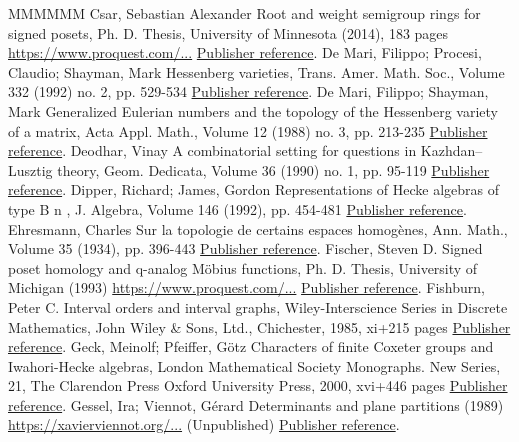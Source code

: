 \begin{thebibliography}{MMMMMM}
 Csar, Sebastian Alexander Root and weight semigroup rings for signed posets, Ph. D. Thesis, University of Minnesota (2014), 183 pages \url{https://www.proquest.com/...} \href{https://alco.centre-mersenne.org/articles/10.5802/alco.459/#CsarThesis}{Publisher reference}.
 De Mari, Filippo; Procesi, Claudio; Shayman, Mark Hessenberg varieties, Trans. Amer. Math. Soc., Volume 332 (1992) no. 2, pp. 529-534 \href{https://alco.centre-mersenne.org/articles/10.5802/alco.459/#DPSHessenberg}{Publisher reference}.
 De Mari, Filippo; Shayman, Mark Generalized Eulerian numbers and the topology of the Hessenberg variety of a matrix, Acta Appl. Math., Volume 12 (1988) no. 3, pp. 213-235 \href{https://alco.centre-mersenne.org/articles/10.5802/alco.459/#DSGenEuler}{Publisher reference}.
 Deodhar, Vinay A combinatorial setting for questions in Kazhdan–Lusztig theory, Geom. Dedicata, Volume 36 (1990) no. 1, pp. 95-119 \href{https://alco.centre-mersenne.org/articles/10.5802/alco.459/#Deodhar90}{Publisher reference}.
 Dipper, Richard; James, Gordon Representations of Hecke algebras of type B n , J. Algebra, Volume 146 (1992), pp. 454-481 \href{https://alco.centre-mersenne.org/articles/10.5802/alco.459/#DJRepHeckeB}{Publisher reference}.
 Ehresmann, Charles Sur la topologie de certains espaces homogènes, Ann. Math., Volume 35 (1934), pp. 396-443 \href{https://alco.centre-mersenne.org/articles/10.5802/alco.459/#Ehresmann}{Publisher reference}.
 Fischer, Steven D. Signed poset homology and q-analog Möbius functions, Ph. D. Thesis, University of Michigan (1993) \url{https://www.proquest.com/...} \href{https://alco.centre-mersenne.org/articles/10.5802/alco.459/#SFischerThesis}{Publisher reference}.
 Fishburn, Peter C. Interval orders and interval graphs, Wiley-Interscience Series in Discrete Mathematics, John Wiley \& Sons, Ltd., Chichester, 1985, xi+215 pages \href{https://alco.centre-mersenne.org/articles/10.5802/alco.459/#Fish}{Publisher reference}.
 Geck, Meinolf; Pfeiffer, Götz Characters of finite Coxeter groups and Iwahori-Hecke algebras, London Mathematical Society Monographs. New Series, 21, The Clarendon Press Oxford University Press, 2000, xvi+446 pages \href{https://alco.centre-mersenne.org/articles/10.5802/alco.459/#GPCharHecke}{Publisher reference}.
 Gessel, Ira; Viennot, Gérard Determinants and plane partitions (1989) \url{https://xavierviennot.org/...} (Unpublished) \href{https://alco.centre-mersenne.org/articles/10.5802/alco.459/#GV}{Publisher reference}.

\end{thebibliography}
